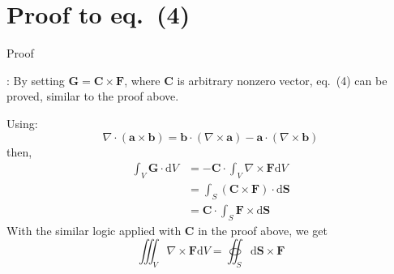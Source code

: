 \documentclass[a4paper]{article}
\begin{document}
\section{Proof to eq.~(4)}
\hypertarget{proof2}{Proof}:
By setting $\mathbf{G}=\mathbf{C}\times\mathbf{F}$, where \textbf{C} is arbitrary nonzero vector, eq.~(4) can be proved, similar to the proof above.

Using:
\[
\nabla\cdot\left(\boldsymbol{a}\times\boldsymbol{b}\right)=\boldsymbol{b}\cdot\left(\nabla\times\boldsymbol{a}\right)-\boldsymbol{a}\cdot\left(\nabla\times\boldsymbol{b}\right)
\]
then,
\begin{align*}
\int_V \boldsymbol{G}\cdot\mathrm{d}V&=-\boldsymbol{C}\cdot\int_V \nabla\times\boldsymbol{F}\mathrm{d}V\\&=\int_S \left(\boldsymbol{C}\times\boldsymbol{F}\right)\cdot\mathrm{d}\boldsymbol{S}\\&=\boldsymbol{C}\cdot\int_S \boldsymbol{F}\times\mathrm{d}\boldsymbol{S}
\end{align*}
With the similar logic applied with \textbf{C} in the proof above, we get
\[
\iiint_V \nabla\times\boldsymbol{F}\mathrm{d}V=\oiint_S \mathrm{d}\boldsymbol{S}\times\boldsymbol{F}
\]
\end{document}
